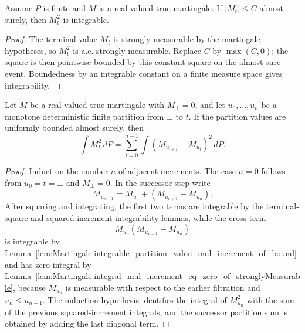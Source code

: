 \begin{lemma}\label{lem:Martingale.integrable_sq_terminal_of_ae_bound}
Assume \(P\) is finite and \(M\) is a real-valued true martingale.  If
\(|M_t|\le C\) almost surely, then \(M_t^2\) is integrable.
\end{lemma}

\begin{proof}
The terminal value \(M_t\) is strongly measurable by the martingale
hypotheses, so \(M_t^2\) is a.e. strongly measurable.  Replace \(C\) by
\(\max(C,0)\); the square is then pointwise bounded by this constant square on
the almost-sure event.  Boundedness by an integrable constant on a finite
measure space gives integrability.
\end{proof}

\begin{lemma}\label{lem:Martingale.integral_sq_terminal_eq_partition_sq_sum_of_bound}
Let \(M\) be a real-valued true martingale with \(M_\bot=0\), and let
\(u_0,\ldots,u_n\) be a monotone deterministic finite partition from
\(\bot\) to \(t\).  If the partition values are uniformly bounded almost
surely, then
\[
  \int M_t^2\,dP
  =
  \sum_{i=0}^{n-1}\int (M_{u_{i+1}}-M_{u_i})^2\,dP .
\]
\end{lemma}

\begin{proof}
Induct on the number \(n\) of adjacent increments.  The case \(n=0\) follows
from \(u_0=t=\bot\) and \(M_\bot=0\).  In the successor step write
\[
  M_{u_{n+1}} = M_{u_n} + (M_{u_{n+1}}-M_{u_n}).
\]
After squaring and integrating, the first two terms are integrable by the
terminal-square and squared-increment integrability lemmas, while the cross
term
\[
  M_{u_n}(M_{u_{n+1}}-M_{u_n})
\]
is integrable by
Lemma~\ref{lem:Martingale.integrable_partition_value_mul_increment_of_bound}
and has zero integral by
Lemma~\ref{lem:Martingale.integral_mul_increment_eq_zero_of_stronglyMeasurable},
because \(M_{u_n}\) is measurable with respect to the earlier filtration and
\(u_n\le u_{n+1}\).  The induction hypothesis identifies the integral of
\(M_{u_n}^2\) with the sum of the previous squared-increment integrals, and
the successor partition sum is obtained by adding the last diagonal term.
\end{proof}

